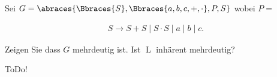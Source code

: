 
\begin{exercise}

Sei $G = \abraces{\Bbraces{S}, \Bbraces{a, b, c, +, \cdot}, P, S}$ wobei $P =$

\begin{align*}
    S \to S + S \mid S \cdot S \mid a \mid b \mid c.
\end{align*}

Zeigen Sie dass $G$ mehrdeutig ist.
Ist $\operatorname L$ inhärent mehrdeutig?

\end{exercise}


\begin{solution}

ToDo!

\end{solution}

